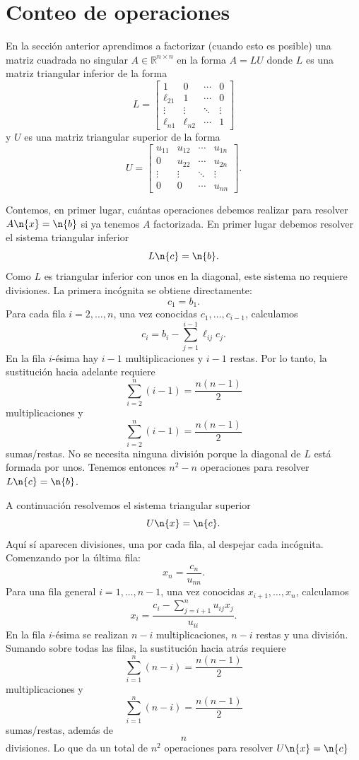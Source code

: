 \section{Conteo de operaciones}\label{sec:conteo}

En la sección anterior aprendimos a factorizar (cuando esto es posible) una matriz cuadrada no singular $A\in \mathbb{R}^{n\times n}$ en la forma $A = LU$ donde $L$ es una matriz triangular inferior de la forma
\[
L  =
\begin{bmatrix}
1 & 0 & \cdots & 0 \\
\ell_{21} & 1 & \cdots & 0 \\
\vdots & \vdots & \ddots & \vdots \\
\ell_{n1} & \ell_{n2} & \cdots & 1
\end{bmatrix}
\]
y $U$ es una matriz triangular superior de la forma
\[
U =
\begin{bmatrix}
u_{11} & u_{12} & \cdots & u_{1n} \\
0 & u_{22} & \cdots & u_{2n} \\
\vdots & \vdots & \ddots & \vdots \\
0 & 0 & \cdots & u_{nn}
\end{bmatrix}.
\]

Contemos, en primer lugar, cuántas operaciones debemos realizar para resolver $A\n{x} = \n{b}$ si ya tenemos $A$ factorizada. En primer lugar debemos resolver el sistema triangular inferior
\[
L\n{c} = \n{b}.
\]
Como $L$ es triangular inferior con unos en la diagonal, este sistema no requiere divisiones. La primera incógnita se obtiene directamente:
\[
c_1 = b_1.
\]
Para cada fila $i=2,\dots,n$, una vez conocidas $c_1,\dots,c_{i-1}$, calculamos
\[
c_i = b_i - \sum_{j=1}^{i-1} \ell_{ij} c_j.
\]
En la fila $i$-ésima hay $i-1$ multiplicaciones y $i-1$ restas. Por lo tanto, la sustitución hacia adelante requiere
\[
\sum_{i=2}^{n} (i-1) = \frac{n(n-1)}{2}
\]
multiplicaciones y
\[
\sum_{i=2}^{n} (i-1) = \frac{n(n-1)}{2}
\]
sumas/restas. No se necesita ninguna división porque la diagonal de $L$ está formada por unos. Tenemos entonces $n^2-n$ operaciones para resolver $L\n{c}=\n{b}$. 

A continuación resolvemos el sistema triangular superior
\[
U\n{x} = \n{c}.
\]
Aquí sí aparecen divisiones, una por cada fila, al despejar cada incógnita. Comenzando por la última fila:
\[
x_n = \frac{c_n}{u_{nn}}.
\]
Para una fila general $i=1,\dots,n-1$, una vez conocidas $x_{i+1},\dots,x_n$, calculamos
\[
x_i = \frac{c_i - \sum_{j=i+1}^{n} u_{ij} x_j}{u_{ii}}.
\]
En la fila $i$-ésima se realizan $n-i$ multiplicaciones, $n-i$ restas y una división. Sumando sobre todas las filas, la sustitución hacia atrás requiere
\[
\sum_{i=1}^{n} (n-i) = \frac{n(n-1)}{2}
\]
multiplicaciones y
\[
\sum_{i=1}^{n} (n-i) = \frac{n(n-1)}{2}
\]
sumas/restas, además de
\[
n
\]
divisiones. Lo que da un total de $n^2$ operaciones para resolver $U\n{x} = \n{c}$

